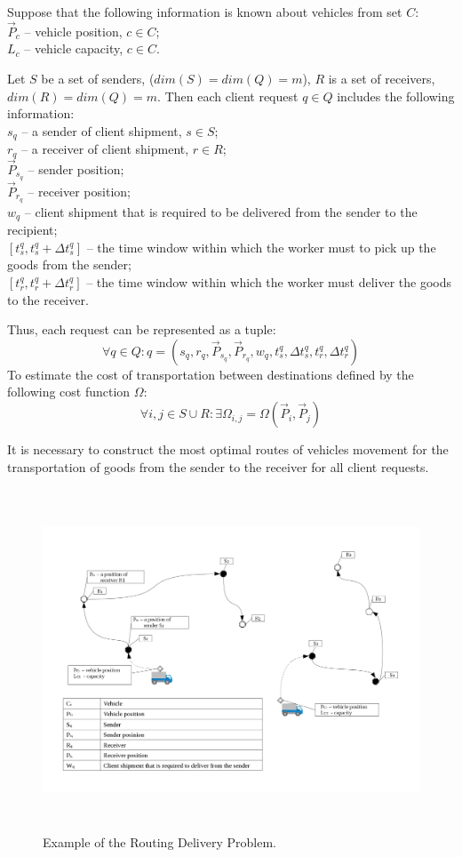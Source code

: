 \documentclass[]{TAACpaper}
\begin{document}
Suppose that the following information is known about vehicles from set $C$: \\
$\vec{P}_c$ -- vehicle position, $c \in C$;\\
$L_c$ -- vehicle capacity, $c \in C$.

Let $S$ be a set of senders, ($dim(S) = dim(Q) = m$), $R$ is a set of receivers, $dim(R) = dim(Q) = m$. Then each client request $q \in Q$ includes the following information:\\
$s_q$ -- a sender of client shipment, $s \in S$; \\
$r_q$ -- a receiver of client shipment, $r \in R$; \\
$\vec{P}_{s_q}$ -- sender position;\\
$\vec{P}_{r_q}$ -- receiver position; \\
$w_q$ -- client shipment that is required to be delivered from the sender to the recipient; \\
$[t_{s}^{q}, t_{s}^{q}+ \Delta{t_{s}^{q}}]$ -- the time window within which the worker must to pick up the goods from the sender;\\ 
$[t_{r}^{q}, t_{r}^{q}+ \Delta{t_{r}^{q}}]$ -- the time window within which the worker must deliver the goods to the receiver.
 
Thus, each request can be represented as a tuple:
\begin{equation}
\forall q \in Q: q = (s_q,r_q, \vec{P}_{s_q}, \vec{P}_{r_q}, w_q, t_{s}^{q}, \Delta{t_{s}^{q}}, t_{r}^{q}, \Delta{t_{r}^{q}})
\end{equation}
To estimate the cost of transportation between destinations defined by the following cost function $\Omega$:
\begin{equation}
\forall i,j \in S \cup R: \exists \Omega_{i,j} = \Omega(\vec{P}_i,\vec{P}_j)
\end{equation}

It is necessary to construct the most optimal routes of vehicles movement for the transportation of goods from the sender to the receiver for all client requests.

\begin{figure}[h]
	\hfil\includegraphics[height=4.0in]{images/scheme}\hfil
	\caption
	{
		Example of the Routing Delivery Problem.
	}
	\label{aba:fig1}
\end{figure}
\end{document}
